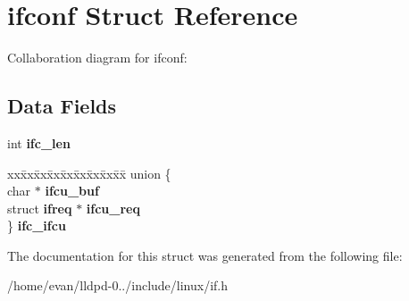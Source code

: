 \section{ifconf \-Struct \-Reference}
\label{structifconf}


\-Collaboration diagram for ifconf\-:
\subsection*{\-Data \-Fields}
\begin{DoxyCompactItemize}
\item 
int {\bfseries ifc\-\_\-len}\label{structifconf_a44e4efcb1ec0a3b46ae43b08cde8f1c7}

\item 
\begin{tabbing}
xx\=xx\=xx\=xx\=xx\=xx\=xx\=xx\=xx\=\kill
union \{\\
\>char $\ast$ {\bfseries ifcu\_buf}\\
\>struct {\bf ifreq} $\ast$ {\bfseries ifcu\_req}\\
\} {\bfseries ifc\_ifcu}\label{structifconf_a0b133fb04e7ffe634fac8a4b53246e74}
\\

\end{tabbing}\end{DoxyCompactItemize}


\-The documentation for this struct was generated from the following file\-:\begin{DoxyCompactItemize}
\item 
/home/evan/lldpd-\/0../include/linux/if.\-h\end{DoxyCompactItemize}
